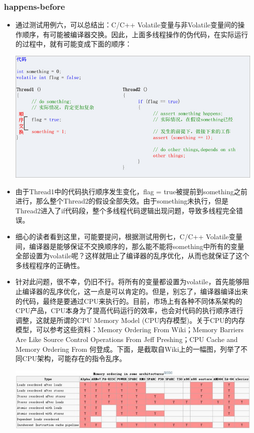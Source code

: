 \documentclass[9pt,b5paper]{article}
\begin{document}
\subsubsection{happens-before}
\label{sec-8-3-4}
\begin{itemize}
\item 通过测试用例六，可以总结出：C/C++ Volatile变量与非Volatile变量间的操作顺序，有可能被编译器交换。因此，上面多线程操作的伪代码，在实际运行的过程中，就有可能变成下面的顺序：

\includegraphics[width=.9\linewidth]{../pic/v9.jpg}

\item 由于Thread1中的代码执行顺序发生变化，flag = true被提前到something之前进行，那么整个Thread2的假设全部失效。由于something未执行，但是Thread2进入了if代码段，整个多线程代码逻辑出现问题，导致多线程完全错误。
\item 细心的读者看到这里，可能要提问，根据测试用例七，C/C++ Volatile变量间，编译器是能够保证不交换顺序的，那么能不能将something中所有的变量全部设置为volatile呢？这样就阻止了编译器的乱序优化，从而也就保证了这个多线程程序的正确性。
\item 针对此问题，很不幸，仍旧不行。将所有的变量都设置为volatile，首先能够阻止编译器的乱序优化，这一点是可以肯定的。但是，别忘了，编译器编译出来的代码，最终是要通过CPU来执行的。目前，市场上有各种不同体系架构的CPU产品，CPU本身为了提高代码运行的效率，也会对代码的执行顺序进行调整，这就是所谓的CPU Memory Model (CPU内存模型)。关于CPU的内存模型，可以参考这些资料：Memory Ordering From Wiki；Memory Barriers Are Like Source Control Operations From Jeff Preshing；CPU Cache and Memory Ordering From 何登成。下面，是截取自Wiki上的一幅图，列举了不同CPU架构，可能存在的指令乱序。

\includegraphics[width=.9\linewidth]{../pic/v10.jpg}


\end{itemize}
\end{document}
